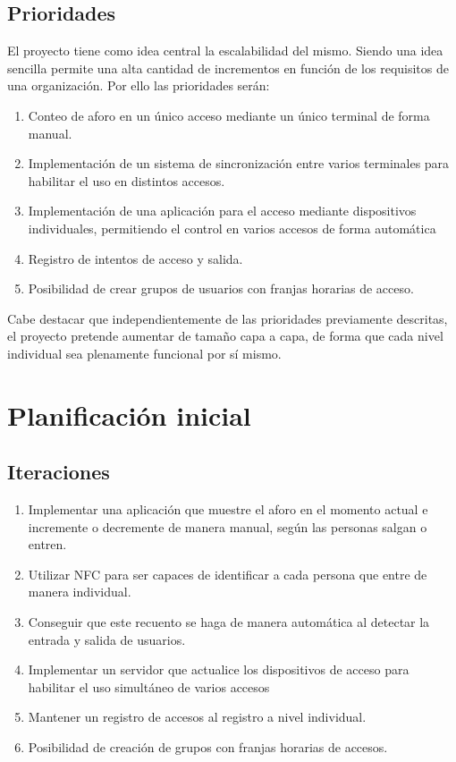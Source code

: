\documentclass[a4paper,openright,12pt]{article}
\begin{document}
\subsection{Prioridades}
El proyecto tiene como idea central la escalabilidad del mismo. Siendo una idea sencilla permite una alta cantidad de incrementos en función de los requisitos de una organización. Por ello las prioridades serán:
\begin{enumerate}
  \item Conteo de aforo en un único acceso mediante un único terminal de forma manual.
  \item Implementación de un sistema de sincronización entre varios terminales para habilitar el uso en distintos accesos.
  \item Implementación de una aplicación para el acceso mediante dispositivos individuales, permitiendo el control en varios accesos de forma automática
  \item Registro de intentos de acceso y salida.
  \item Posibilidad de crear grupos de usuarios con franjas horarias de acceso.
\end{enumerate}

Cabe destacar que independientemente de las prioridades previamente descritas, el proyecto pretende aumentar de tamaño capa a capa, de forma que cada nivel individual sea plenamente funcional por sí mismo.
\section{Planificación inicial}

\subsection{Iteraciones}
\begin{enumerate}
    \item Implementar una aplicación que muestre el aforo en el momento actual e incremente o decremente de manera manual, según las personas salgan o entren.
    \item Utilizar NFC \cite{NFC} para ser capaces de identificar a cada persona que entre de manera individual.
    \item Conseguir que este recuento se haga de manera automática al detectar la entrada y salida de usuarios.
    \item Implementar un servidor que actualice los dispositivos de acceso para habilitar el uso simultáneo de varios accesos
    \item Mantener un registro de accesos al registro a nivel individual.
    \item Posibilidad de creación de grupos con franjas horarias de accesos.
\end{enumerate}
\end{document}
